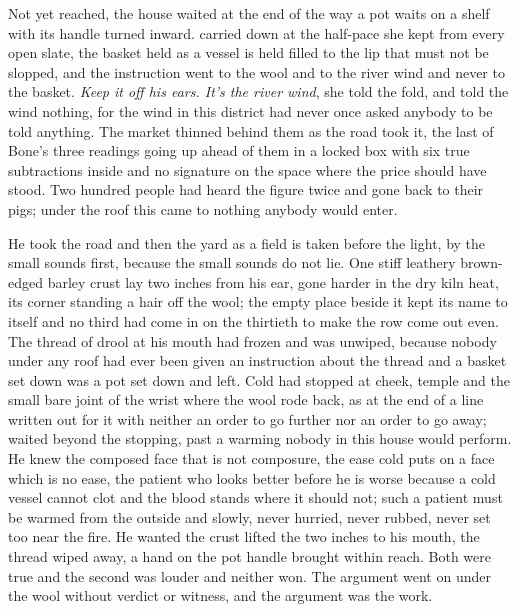 Not yet reached, the house waited at the end of  the way a pot waits on a shelf with its handle turned inward.  carried  down at the half-pace she kept from every open slate, the basket held as a vessel is held filled to the lip that must not be slopped, and the instruction went to the wool and to the river wind and never to the basket. \emph{Keep it off his ears. It's the river wind}, she told the fold, and told the wind nothing, for the wind in this district had never once asked anybody to be told anything. The market thinned behind them as the road took it, the last of Bone's three readings going up ahead of them in a locked box with six true subtractions inside and no signature on the space where the price should have stood. Two hundred people had heard the figure twice and gone back to their pigs; under the roof this came to nothing anybody would enter.

He took the road and then the yard as a field is taken before the light, by the small sounds first, because the small sounds do not lie. One stiff leathery brown-edged barley crust lay two inches from his ear, gone harder in the dry kiln heat, its corner standing a hair off the wool; the empty place beside it kept its name to itself and no third had come in on the thirtieth to make the row come out even. The thread of drool at his mouth had frozen and was unwiped, because nobody under any roof had ever been given an instruction about the thread and a basket set down was a pot set down and left. Cold had stopped at cheek, temple and the small bare joint of the wrist where the wool rode back, as at the end of a line written out for it with neither an order to go further nor an order to go away;  waited beyond the stopping, past a warming nobody in this house would perform. He knew the composed face that is not composure, the ease cold puts on a face which is no ease, the patient who looks better before he is worse because a cold vessel cannot clot and the blood stands where it should not; such a patient must be warmed from the outside and slowly, never hurried, never rubbed, never set too near the fire. He wanted the crust lifted the two inches to his mouth, the thread wiped away, a hand on the pot handle brought within reach. Both were true and the second was louder and neither won. The argument went on under the wool without verdict or witness, and the argument was the work.

